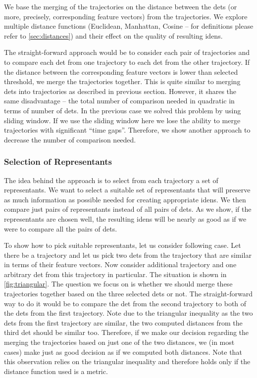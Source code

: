 We base the merging of the trajectories on the distance between the \glspl{det} (or more, precisely, corresponding feature vectors) from the trajectories. We explore multiple distance functions (Euclidean, Manhattan, Cosine -- for definitions please refer to \autoref{sec:distances}) and their effect on the quality of resulting \glspl{iden}.

The straight-forward approach would be to consider each pair of trajectories and to compare each \gls{det} from one trajectory to each \gls{det} from the other trajectory. If the distance between the corresponding feature vectors is lower than selected threshold, we merge the trajectories together. This is quite similar to merging \glspl{det} into trajectories as described in previous section. However, it shares the same disadvantage -- the total number of comparison needed in quadratic in terms of number of \glspl{det}. In the previous case we solved this problem by using sliding window. If we use the sliding window here we lose the ability to merge trajectories with significant ``time gaps''. Therefore, we show another approach to decrease the number of comparison needed.


\subsubsection{Selection of Representants}


The idea behind the approach is to select from each trajectory a set of representants. We want to select a suitable set of representants that will preserve as much information as possible needed for creating appropriate \glspl{iden}. We then compare just pairs of representants instead of all pairs of \glspl{det}. As we show, if the representants are chosen well, the resulting \glspl{iden} will be nearly as good as if we were to compare all the pairs of \glspl{det}.

To show how to pick suitable representants, let us consider following case. Let there be a trajectory and let us pick two \glspl{det} from the trajectory that are similar in terms of their feature vectors. Now consider additional trajectory and one arbitrary \gls{det} from this trajectory in particular. The situation is shown in \autoref{fig:triangular}. The question we focus on is whether we should merge these trajectories together based on the three selected \glspl{det} or not. The straight-forward way to do it would be to compare the \gls{det} from the second trajectory to both of the \glspl{det} from the first trajectory. Note due to the triangular inequality as the two \glspl{det} from the first trajectory are similar, the two computed distances from the third \gls{det} should be similar too. Therefore, if we make our decision regarding the merging the trajectories based on just one of the two distances, we (in most cases) make just as good decision as if we computed both distances. Note that this observation relies on the triangular inequality and therefore holds only if the distance function used is a metric.

